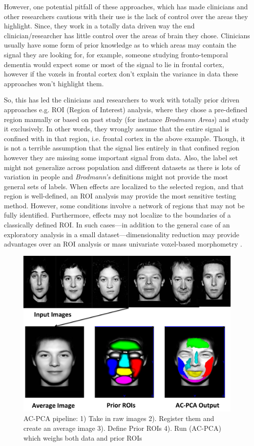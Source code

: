 \documentclass{llncs}
\begin{document}
However, one potential pitfall of these approaches, which has made clinicians and other researchers cautious with their use is the lack of control over the areas they highlight. Since, they work in a totally data driven way the end clinician/researcher has little control over the areas of brain they chose. Clinicians usually have some form of prior knowledge as to which areas may contain the signal they are looking for, for example, someone studying fronto-temporal dementia would expect some or most of the signal to lie in frontal cortex, however if the voxels in frontal cortex don't explain the variance in data these approaches won't highlight them. 


So, this has led the clinicians and researchers to work with totally prior driven approaches e.g. ROI (Region of Interest) analysis, where they chose a pre-defined region manually or based on past study (for instance {\em Brodmann Areas}) and study it exclusively. In other words, they wrongly assume that the entire signal is confined with in that region, i.e. frontal cortex in the above example. Though, it is not a terrible assumption that the signal lies entirely in that confined region however they are missing some important signal from data. Also, the label set might not generalize across population and different datasets as there is lots of variation in people and {\it Brodmann's} definitions might not provide the most general sets of labels. 
When effects are localized to the selected region, and that region is well-defined, an ROI analysis may
provide the most sensitive testing method.  However, some conditions
involve a network of regions that may not be fully identified.
Furthermore, effects may not localize to the boundaries of a
classically defined ROI.  In such cases---in addition to the general
case of an exploratory analysis in a small dataset---dimensionality
reduction may provide advantages over an ROI analysis or mass
univariate voxel-based morphometry \cite{Ashburner2005}.

\begin{figure}
\begin{center}
\includegraphics[width=0.7\linewidth]{fig1.pdf} 
\end{center}
\vspace{-0.2in}
\caption{AC-PCA pipeline: 1) Take in raw images 2). Register them and create an average image 3). Define Prior ROIs 4). Run (AC-PCA) which weighs both data and prior ROIs }
\label{fig:faces}
\end{figure}
\end{document}
